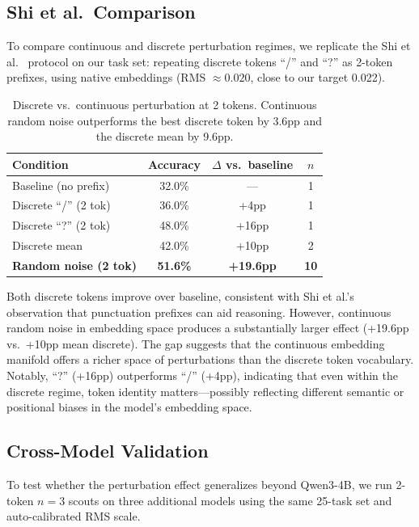 \documentclass{article}
\begin{document}
\subsection{Shi et al.\ Comparison} %
\label{sec:shi}

To compare continuous and discrete perturbation regimes, we replicate
the Shi et al.~\cite{shi2025} protocol on our task set: repeating
discrete tokens ``/'' and ``?'' as 2-token prefixes, using native
embeddings (RMS $\approx 0.020$, close to our target 0.022).

\begin{table}[h]
\centering
\begin{tabular}{lccc}
\toprule
\textbf{Condition} & \textbf{Accuracy} & \textbf{$\Delta$ vs.\ baseline} & \textbf{$n$} \\
\midrule
Baseline (no prefix) & 32.0\% & --- & 1 \\
Discrete ``/'' (2 tok) & 36.0\% & +4pp & 1 \\
Discrete ``?'' (2 tok) & 48.0\% & +16pp & 1 \\
Discrete mean & 42.0\% & +10pp & 2 \\
\textbf{Random noise (2 tok)} & \textbf{51.6\%} & \textbf{+19.6pp} & \textbf{10} \\
\bottomrule
\end{tabular}
\caption{Discrete vs.\ continuous perturbation at 2 tokens.
Continuous random noise outperforms the best discrete token by 3.6pp
and the discrete mean by 9.6pp.}
\label{tab:shi}
\end{table}

Both discrete tokens improve over baseline, consistent with Shi et
al.'s observation that punctuation prefixes can aid reasoning. However,
continuous random noise in embedding space produces a substantially
larger effect (+19.6pp vs.\ +10pp mean discrete). The gap suggests
that the continuous embedding manifold offers a richer space of
perturbations than the discrete token vocabulary. Notably, ``?''
(+16pp) outperforms ``/'' (+4pp), indicating that even within the
discrete regime, token identity matters---possibly reflecting
different semantic or positional biases in the model's embedding
space.

\subsection{Cross-Model Validation} %
\label{sec:crossmodel}

To test whether the perturbation effect generalizes beyond Qwen3-4B,
we run 2-token $n = 3$ scouts on three additional models using the
same 25-task set and auto-calibrated RMS scale.
\end{document}
